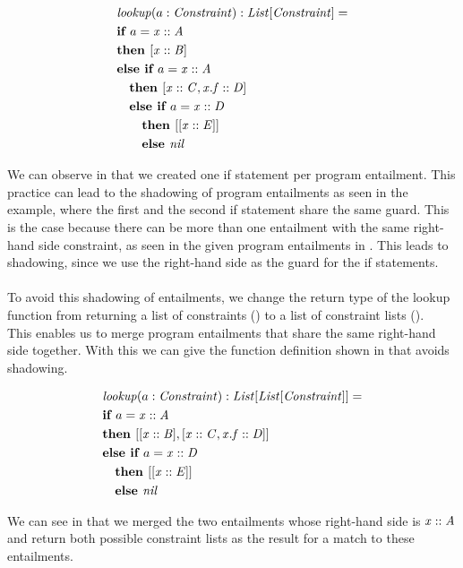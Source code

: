 \begin{example}
\label{ex:lookup-fun-ite}
\begin{align*}
&\mathit{lookup}(a: \mathit{Constraint}): \mathit{List[\mathit{Constraint}]} = \\
&\textbf{if } a = \mathit{x} :: \mathit{A}\\
&\textbf{then } [\mathit{x} :: \mathit{B}]\\
&\textbf{else } \textbf{if } a = \mathit{x} :: \mathit{A}\\
&\quad \textbf{then } [\mathit{x} :: \mathit{C}, \mathit{x.f} :: \mathit{D}]\\
&\quad \textbf{else }\textbf{if } a = \mathit{x} :: \mathit{D}\\
&\qquad \textbf{then } [[\mathit{x} :: \mathit{E}]]\\
&\qquad \textbf{else } \mathit{nil}\\
\end{align*}
\end{example}
%
We can observe in  that we
created one if statement per program entailment.
This practice can lead to the shadowing of program entailments
as seen in the example, where the first and the second if statement share the same guard.
This is the case because there can be more than one entailment
with the same right-hand side constraint,
as seen in the given program entailments in .
This leads to shadowing, since we use the
right-hand side as the guard for the if statements.\\
\\
To avoid this shadowing of entailments,
we change the return type of the lookup function
from returning a list of constraints (\Constrs)
to a list of constraint lists (\Constrss).\\
This enables us to merge program entailments that
share the same right-hand side together.
With this we can give the function definition shown in
 that avoids shadowing.
%
\begin{example}
\label{ex:lookup-fun-shadowing}
\begin{align*}
&\mathit{lookup}(a: \mathit{Constraint}): \mathit{List[\mathit{List[\mathit{Constraint}]}]} = \\
&\textbf{if } a = \mathit{x} :: \mathit{A}\\
&\textbf{then } [[\mathit{x} :: \mathit{B}], [\mathit{x} :: \mathit{C}, \mathit{x.f} :: \mathit{D}]]\\
&\textbf{else } \textbf{if } a = \mathit{x} :: \mathit{D}\\
&\quad\textbf{then } [[\mathit{x} :: \mathit{E}]]\\
&\quad\textbf{else } \mathit{nil}\\
\end{align*}
\end{example}
%
We can see in 
that we merged the two entailments whose right-hand side
is $\mathit{x} :: \mathit{A}$ and return both possible constraint lists
as the result for a match to these entailments.


